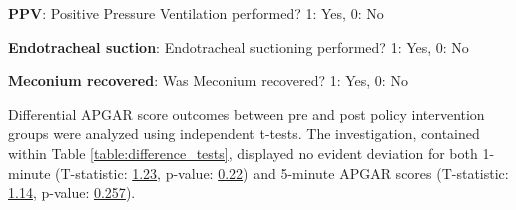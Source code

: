 \documentclass[11pt]{article}
\begin{document}
\begin{table}[h]
\caption{\protect\hyperlink{file-table-1-pkl}{Association between treatments and change in policy using Chi-square test}}
\label{table:association_tests}
\begin{threeparttable}
\renewcommand{\TPTminimum}{\linewidth}
\begin{tablenotes}
\footnotesize
\item \textbf{PPV}: Positive Pressure Ventilation performed?
1: Yes, 0: No
\item \textbf{Endotracheal suction}: Endotracheal suctioning performed?
1: Yes, 0: No
\item \textbf{Meconium recovered}: Was Meconium recovered?
1: Yes, 0: No
\end{tablenotes}
\end{threeparttable}
\end{table}

Differential APGAR score outcomes between pre and post policy intervention groups were analyzed using independent t-tests. The investigation, contained within Table \ref{table:difference_tests}, displayed no evident deviation for both 1-minute (T-statistic: \hyperlink{C0a}{1.23}, p-value: \hyperlink{C0b}{0.22}) and 5-minute APGAR scores (T-statistic: \hyperlink{C1a}{1.14}, p-value: \hyperlink{C1b}{0.257}).
\end{document}
